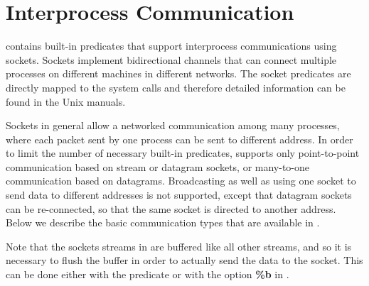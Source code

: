 %
% 
% 
% 
% 
%
%

\chapter{Interprocess Communication}
\label{sockets}
{\eclipse} contains built-in predicates that support interprocess communications
using sockets.
Sockets implement bidirectional channels
that can connect multiple processes on different machines
in different networks.
The socket predicates are directly mapped to the system calls
and therefore detailed information can be found in the Unix manuals.

Sockets in general allow a networked communication among many processes,
where each packet sent by one process can be sent to different address.
In order to limit the number of necessary built-in predicates,
{\eclipse} supports only point-to-point communication based
on stream or datagram sockets, or many-to-one communication
based on datagrams.
Broadcasting as well as using one socket to send data
to different addresses is not supported, except that
datagram sockets can be re-connected, so that the same
socket is directed to another address.
Below we describe the basic communication types that are available
in {\eclipse}.

Note that the sockets streams in {\eclipse} are buffered like
all other streams, and so it is necessary to flush
the buffer in order to actually send the data to the socket.
This can be done either with the  predicate
or with the option {\bf \%b} in .


